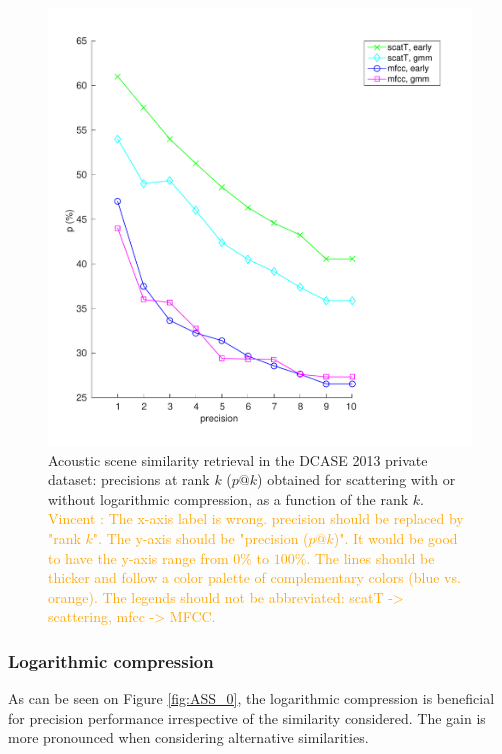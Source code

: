 \documentclass[smallextended]{svjour3}
\newcommand{\vl}[1]{\textcolor{orange}{Vincent : #1}}
\begin{document}
\begin{figure}[t]
\begin{center}
\includegraphics[width=\columnwidth]{figures/baselines}
\caption{Acoustic scene similarity retrieval in the DCASE 2013 private dataset: precisions at rank $k$ ($p@k$) obtained for scattering with or without logarithmic compression, as a function of the rank $k$.
\vl{The x-axis label is wrong. precision should be replaced by "rank $k$". The y-axis should be "precision ($p@k$)". It would be good to have the y-axis range from $0\%$ to $100\%$.
The lines should be thicker and follow a color palette of complementary colors (blue vs. orange). The legends should not be abbreviated: scatT -> scattering, mfcc -> MFCC. }}
\label{fig:ASS_-1}
\end{center}
\end{figure}

\subsubsection*{Logarithmic compression}

As can be seen on Figure \ref{fig:ASS_0}, the logarithmic compression is beneficial for precision performance irrespective of the similarity considered. The gain is more pronounced when considering alternative similarities.
\end{document}
